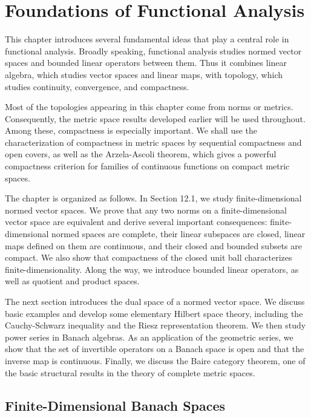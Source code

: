\chapter{Foundations of Functional Analysis}

This chapter introduces several fundamental ideas that play a central role in functional analysis. Broadly speaking, functional analysis studies normed vector spaces and bounded linear operators between them. Thus it combines linear algebra, which studies vector spaces and linear maps, with topology, which studies continuity, convergence, and compactness.

Most of the topologies appearing in this chapter come from norms or metrics. Consequently, the metric space results developed earlier will be used throughout. Among these, compactness is especially important. We shall use the characterization of compactness in metric spaces by sequential compactness and open covers, as well as the Arzela-Ascoli theorem, which gives a powerful compactness criterion for families of continuous functions on compact metric spaces.

The chapter is organized as follows. In Section 12.1, we study finite-dimensional normed vector spaces. We prove that any two norms on a finite-dimensional vector space are equivalent and derive several important consequences: finite-dimensional normed spaces are complete, their linear subspaces are closed, linear maps defined on them are continuous, and their closed and bounded subsets are compact. We also show that compactness of the closed unit ball characterizes finite-dimensionality. Along the way, we introduce bounded linear operators, as well as quotient and product spaces.

The next section introduces the dual space of a normed vector space. We discuss basic examples and develop some elementary Hilbert space theory, including the Cauchy-Schwarz inequality and the Riesz representation theorem. We then study power series in Banach algebras. As an application of the geometric series, we show that the set of invertible operators on a Banach space is open and that the inverse map is continuous. Finally, we discuss the Baire category theorem, one of the basic structural results in the theory of complete metric spaces.

\section{Finite-Dimensional Banach Spaces}

